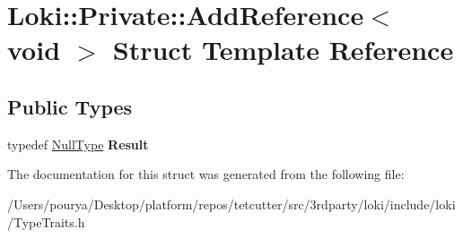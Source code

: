 \hypertarget{structLoki_1_1Private_1_1AddReference_3_01void_01_4}{}\section{Loki\+:\+:Private\+:\+:Add\+Reference$<$ void $>$ Struct Template Reference}
\label{structLoki_1_1Private_1_1AddReference_3_01void_01_4}
\subsection*{Public Types}
\begin{DoxyCompactItemize}
\item 
\hypertarget{structLoki_1_1Private_1_1AddReference_3_01void_01_4_aed71b73d7bc3094ee1459d1fc82994be}{}typedef \hyperlink{classLoki_1_1NullType}{Null\+Type} {\bfseries Result}\label{structLoki_1_1Private_1_1AddReference_3_01void_01_4_aed71b73d7bc3094ee1459d1fc82994be}

\end{DoxyCompactItemize}


The documentation for this struct was generated from the following file\+:\begin{DoxyCompactItemize}
\item 
/\+Users/pourya/\+Desktop/platform/repos/tetcutter/src/3rdparty/loki/include/loki/Type\+Traits.\+h\end{DoxyCompactItemize}
